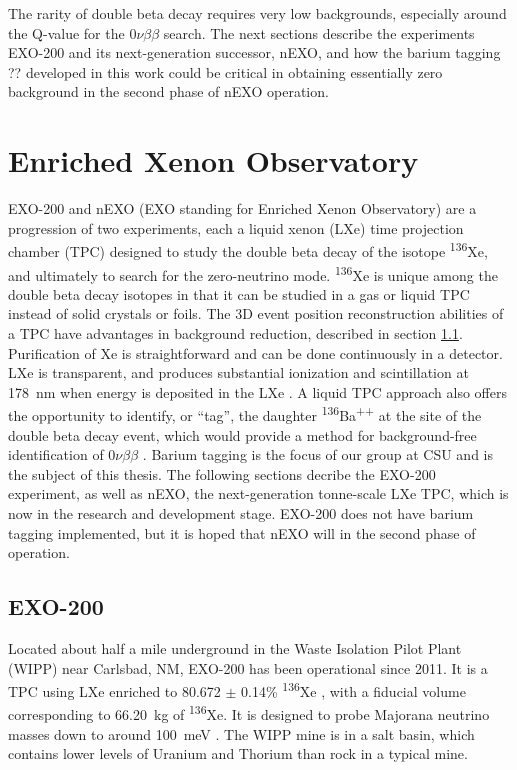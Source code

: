 
The rarity of double beta decay requires very low backgrounds, especially around the Q-value for the $0\nu\beta\beta$ search. The next sections describe the experiments EXO-200 and its next-generation successor, nEXO, and how the barium tagging {\color{red}??} developed in this work could be critical in obtaining essentially zero background in the second phase of nEXO operation.

\section{Enriched Xenon Observatory}

EXO-200 and nEXO (EXO standing for Enriched Xenon Observatory) are a progression of two experiments, each a liquid xenon (LXe) time projection chamber (TPC) designed to study the double beta decay of the isotope \textsuperscript{136}Xe, and ultimately to search for the zero-neutrino mode.  \textsuperscript{136}Xe is unique among the double beta decay isotopes in that it can be studied in a gas or liquid TPC instead of solid crystals or foils.  The 3D event position reconstruction abilities of a TPC have advantages in background reduction, described in section \ref{subsec:EXO200}.  Purification of Xe is straightforward and can be done continuously in a detector.  LXe is transparent, and produces substantial ionization and scintillation at 178~nm when energy is deposited in the LXe \cite{EXO200TwoNuLong}.  A liquid TPC approach also offers the opportunity to identify, or ``tag'', the daughter \textsuperscript{136}Ba\textsuperscript{++} at the site of the double beta decay event, which would provide a method for background-free identification of $0\nu\beta\beta$ \cite{Moe1991}. Barium tagging is the focus of our group at CSU and is the subject of this thesis.  The following sections decribe the EXO-200 experiment, as well as nEXO, the next-generation tonne-scale LXe TPC, which is now in the research and development stage.  EXO-200 does not have barium tagging implemented, but it is hoped that nEXO will in the second phase of operation. 

\subsection{EXO-200}
\label{subsec:EXO200}


Located about half a mile underground in the Waste Isolation Pilot Plant (WIPP) near Carlsbad, NM, EXO-200 has been operational since 2011.  It is a TPC using LXe enriched to 80.672 $\pm$ 0.14\% \textsuperscript{136}Xe \cite{EXO200TwoNuLong}, with a fiducial volume corresponding to 66.20~kg of \textsuperscript{136}Xe. It is designed to probe Majorana neutrino masses down to around 100~meV \cite{EXO200instrumentationPart1}.  The WIPP mine is in a salt basin, which contains lower levels of Uranium and Thorium than rock in a typical mine.

